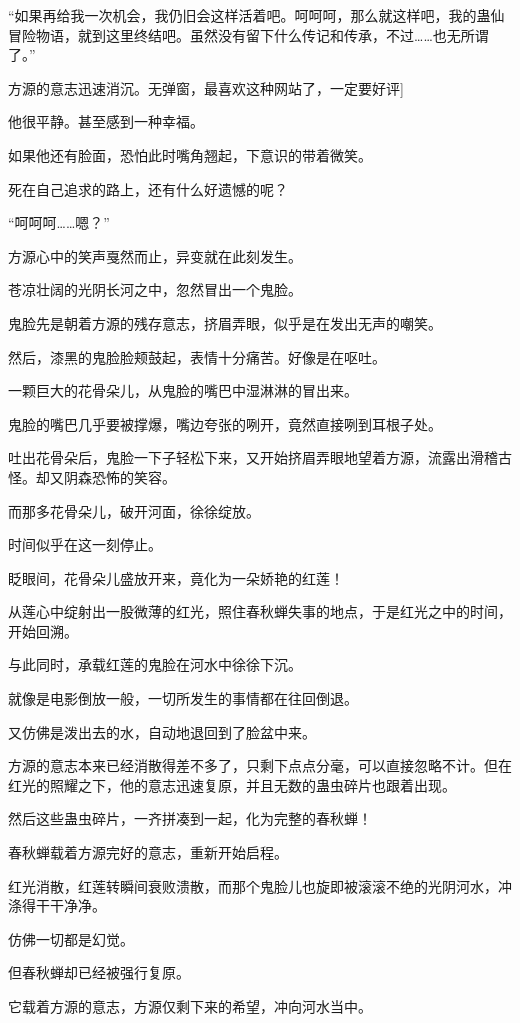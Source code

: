 \begin{this_body}
“如果再给我一次机会，我仍旧会这样活着吧。呵呵呵，那么就这样吧，我的蛊仙冒险物语，就到这里终结吧。虽然没有留下什么传记和传承，不过……也无所谓了。”

方源的意志迅速消沉。无弹窗，最喜欢这种网站了，一定要好评]

他很平静。甚至感到一种幸福。

如果他还有脸面，恐怕此时嘴角翘起，下意识的带着微笑。

死在自己追求的路上，还有什么好遗憾的呢？

“呵呵呵……嗯？”

方源心中的笑声戛然而止，异变就在此刻发生。

苍凉壮阔的光阴长河之中，忽然冒出一个鬼脸。

鬼脸先是朝着方源的残存意志，挤眉弄眼，似乎是在发出无声的嘲笑。

然后，漆黑的鬼脸脸颊鼓起，表情十分痛苦。好像是在呕吐。

一颗巨大的花骨朵儿，从鬼脸的嘴巴中湿淋淋的冒出来。

鬼脸的嘴巴几乎要被撑爆，嘴边夸张的咧开，竟然直接咧到耳根子处。

吐出花骨朵后，鬼脸一下子轻松下来，又开始挤眉弄眼地望着方源，流露出滑稽古怪。却又阴森恐怖的笑容。

而那多花骨朵儿，破开河面，徐徐绽放。

时间似乎在这一刻停止。

眨眼间，花骨朵儿盛放开来，竟化为一朵娇艳的红莲！

从莲心中绽射出一股微薄的红光，照住春秋蝉失事的地点，于是红光之中的时间，开始回溯。

与此同时，承载红莲的鬼脸在河水中徐徐下沉。

就像是电影倒放一般，一切所发生的事情都在往回倒退。

又仿佛是泼出去的水，自动地退回到了脸盆中来。

方源的意志本来已经消散得差不多了，只剩下点点分毫，可以直接忽略不计。但在红光的照耀之下，他的意志迅速复原，并且无数的蛊虫碎片也跟着出现。

然后这些蛊虫碎片，一齐拼凑到一起，化为完整的春秋蝉！

春秋蝉载着方源完好的意志，重新开始启程。

红光消散，红莲转瞬间衰败溃散，而那个鬼脸儿也旋即被滚滚不绝的光阴河水，冲涤得干干净净。

仿佛一切都是幻觉。

但春秋蝉却已经被强行复原。

它载着方源的意志，方源仅剩下来的希望，冲向河水当中。


\end{this_body}

